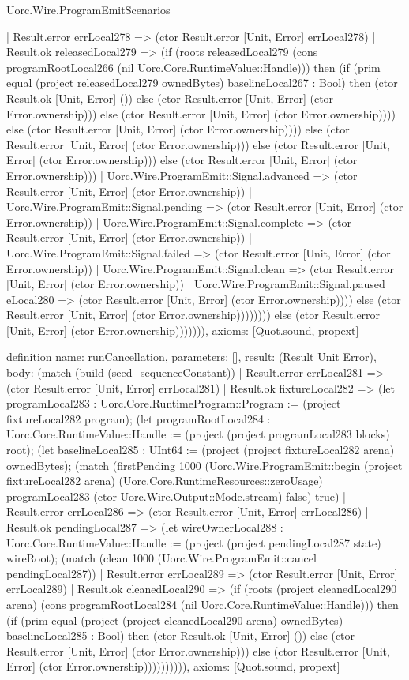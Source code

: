 \begin{lexlean}{Uorc.Wire.ProgramEmitScenarios}
\begin{semanticmodule}
{              | Result.error errLocal278 => (ctor Result.error [Unit, Error] errLocal278)
              | Result.ok releasedLocal279 => (if (roots releasedLocal279 (cons programRootLocal266 (nil Uorc.Core.RuntimeValue::Handle))) then (if (prim equal (project releasedLocal279 ownedBytes) baselineLocal267 : Bool) then (ctor Result.ok [Unit, Error] ()) else (ctor Result.error [Unit, Error] (ctor Error.ownership))) else (ctor Result.error [Unit, Error] (ctor Error.ownership)))) else (ctor Result.error [Unit, Error] (ctor Error.ownership)))) else (ctor Result.error [Unit, Error] (ctor Error.ownership))) else (ctor Result.error [Unit, Error] (ctor Error.ownership))) else (ctor Result.error [Unit, Error] (ctor Error.ownership)))
          | Uorc.Wire.ProgramEmit::Signal.advanced => (ctor Result.error [Unit, Error] (ctor Error.ownership))
          | Uorc.Wire.ProgramEmit::Signal.pending => (ctor Result.error [Unit, Error] (ctor Error.ownership))
          | Uorc.Wire.ProgramEmit::Signal.complete => (ctor Result.error [Unit, Error] (ctor Error.ownership))
          | Uorc.Wire.ProgramEmit::Signal.failed => (ctor Result.error [Unit, Error] (ctor Error.ownership))
          | Uorc.Wire.ProgramEmit::Signal.clean => (ctor Result.error [Unit, Error] (ctor Error.ownership))
          | Uorc.Wire.ProgramEmit::Signal.paused eLocal280 => (ctor Result.error [Unit, Error] (ctor Error.ownership)))) else (ctor Result.error [Unit, Error] (ctor Error.ownership)))))))) else (ctor Result.error [Unit, Error] (ctor Error.ownership))))))),
  axioms: [Quot.sound, propext]
}

definition{
  name: runCancellation,
  parameters: [],
  result: (Result Unit Error),
  body: (match (build (seed_sequenceConstant))
    | Result.error errLocal281 => (ctor Result.error [Unit, Error] errLocal281)
    | Result.ok fixtureLocal282 => (let programLocal283 : Uorc.Core.RuntimeProgram::Program := (project fixtureLocal282 program); (let programRootLocal284 : Uorc.Core.RuntimeValue::Handle := (project (project programLocal283 blocks) root); (let baselineLocal285 : UInt64 := (project (project fixtureLocal282 arena) ownedBytes); (match (firstPending 1000 (Uorc.Wire.ProgramEmit::begin (project fixtureLocal282 arena) (Uorc.Core.RuntimeResources::zeroUsage) programLocal283 (ctor Uorc.Wire.Output::Mode.stream) false) true)
      | Result.error errLocal286 => (ctor Result.error [Unit, Error] errLocal286)
      | Result.ok pendingLocal287 => (let wireOwnerLocal288 : Uorc.Core.RuntimeValue::Handle := (project (project pendingLocal287 state) wireRoot); (match (clean 1000 (Uorc.Wire.ProgramEmit::cancel pendingLocal287))
        | Result.error errLocal289 => (ctor Result.error [Unit, Error] errLocal289)
        | Result.ok cleanedLocal290 => (if (roots (project cleanedLocal290 arena) (cons programRootLocal284 (nil Uorc.Core.RuntimeValue::Handle))) then (if (prim equal (project (project cleanedLocal290 arena) ownedBytes) baselineLocal285 : Bool) then (ctor Result.ok [Unit, Error] ()) else (ctor Result.error [Unit, Error] (ctor Error.ownership))) else (ctor Result.error [Unit, Error] (ctor Error.ownership)))))))))),
  axioms: [Quot.sound, propext]
}


\end{semanticmodule}
\end{lexlean}

